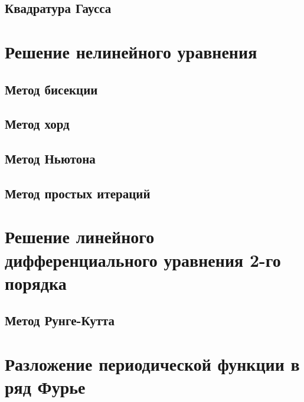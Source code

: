 \documentclass{article}
\begin{document}
\subsection{Квадратура Гаусса}

\section{Решение нелинейного уравнения}
\subsection{Метод бисекции}
\subsection{Метод хорд}
\subsection{Метод Ньютона}
\subsection{Метод простых итераций}

\section{Решение линейного дифференциального уравнения 2-го порядка}
\subsection{Метод Рунге-Кутта}

\section{Разложение периодической функции в ряд Фурье}
\end{document}
